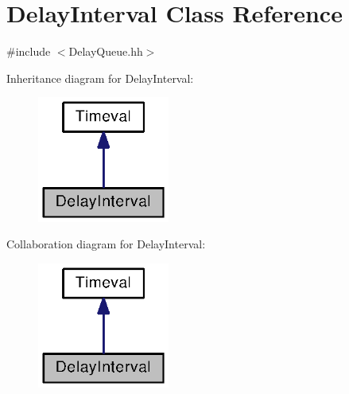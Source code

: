\section{Delay\+Interval Class Reference}
\label{classDelayInterval}


{\ttfamily \#include $<$Delay\+Queue.\+hh$>$}



Inheritance diagram for Delay\+Interval\+:
\nopagebreak
\begin{figure}[H]
\begin{center}
\leavevmode
\includegraphics[width=123pt]{classDelayInterval__inherit__graph}
\end{center}
\end{figure}


Collaboration diagram for Delay\+Interval\+:
\nopagebreak
\begin{figure}[H]
\begin{center}
\leavevmode
\includegraphics[width=123pt]{classDelayInterval__coll__graph}
\end{center}
\end{figure}
